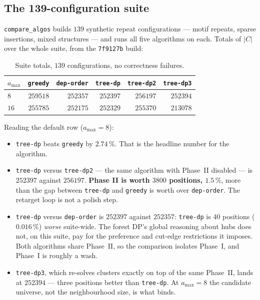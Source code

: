 \documentclass[11pt,a4paper]{article}
\theoremstyle{definition}
\theoremstyle{plain}
\theoremstyle{remark}
\begin{document}
\subsection{The 139-configuration suite}

\texttt{compare\_algos} builds $139$ synthetic repeat configurations ---
motif repeats, sparse insertions, mixed structures --- and runs all five
algorithms on each. Totals of $|C|$ over the whole suite, from the
\texttt{7f9127b} build:

\begin{table}[h]
\centering
\caption{Suite totals, $139$ configurations, no correctness failures.}
\label{tab:suite}
\begin{tabular}{lrrrrr}
\toprule
$a_{\max}$ & \texttt{greedy} & \texttt{dep-order} & \texttt{tree-dp} &
\texttt{tree-dp2} & \texttt{tree-dp3} \\
\midrule
$8$  & $259518$ & $252357$ & $252397$ & $256197$ & $252394$ \\
$16$ & $255785$ & $252175$ & $252329$ & $255370$ & $213078$ \\
\bottomrule
\end{tabular}
\end{table}

Reading the default row ($a_{\max} = 8$):

\begin{itemize}
\item \texttt{tree-dp} beats \texttt{greedy} by $2.74\,\%$. That is the
  headline number for the algorithm.
\item \texttt{tree-dp} versus \texttt{tree-dp2} --- the same algorithm
  with Phase~II disabled --- is $252397$ against $256197$. \textbf{Phase
  II is worth $3800$ positions, $1.5\,\%$}, more than the gap between
  \texttt{tree-dp} and \texttt{greedy} is worth over \texttt{dep-order}.
  The retarget loop is not a polish step.
\item \texttt{tree-dp} versus \texttt{dep-order} is $252397$ against
  $252357$: \texttt{tree-dp} is $40$ positions ($0.016\,\%$)
  \emph{worse} suite-wide. The forest DP's global reasoning about hubs
  does not, on this suite, pay for the preference and cut-edge
  restrictions it imposes. Both algorithms share Phase~II, so the
  comparison isolates Phase~I, and Phase~I is roughly a wash.
\item \texttt{tree-dp3}, which re-solves clusters exactly on top of the
  same Phase~II, lands at $252394$ --- three positions better than
  \texttt{tree-dp}. At $a_{\max} = 8$ the candidate universe, not the
  neighbourhood size, is what binds.
\end{itemize}
\end{document}
